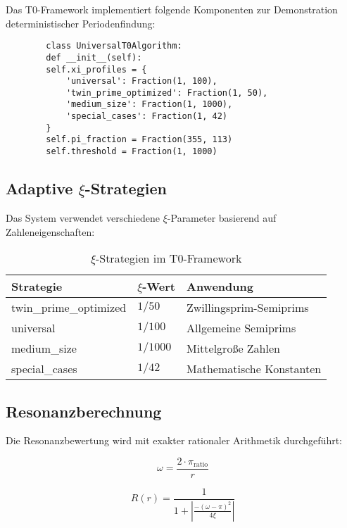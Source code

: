 \documentclass[12pt,a4paper]{article}
\begin{document}
	Das T0-Framework implementiert folgende Komponenten zur Demonstration deterministischer Periodenfindung:
	
	\begin{verbatim}
		class UniversalT0Algorithm:
		def __init__(self):
		self.xi_profiles = {
			'universal': Fraction(1, 100),
			'twin_prime_optimized': Fraction(1, 50),
			'medium_size': Fraction(1, 1000),
			'special_cases': Fraction(1, 42)
		}
		self.pi_fraction = Fraction(355, 113)
		self.threshold = Fraction(1, 1000)
	\end{verbatim}
	
	\subsection{Adaptive $\xi$-Strategien}
	
	Das System verwendet verschiedene $\xi$-Parameter basierend auf Zahleneigenschaften:
	
	\begin{table}[H]
		\centering
		\caption{$\xi$-Strategien im T0-Framework}
		\begin{tabular}{lll}
			\toprule
			\textbf{Strategie} & \textbf{$\xi$-Wert} & \textbf{Anwendung} \\
			\midrule
			twin\_prime\_optimized & $1/50$ & Zwillingsprim-Semiprims \\
			universal & $1/100$ & Allgemeine Semiprims \\
			medium\_size & $1/1000$ & Mittelgroße Zahlen \\
			special\_cases & $1/42$ & Mathematische Konstanten \\
			\bottomrule
		\end{tabular}
		\label{tab:xi_strategies}
	\end{table}
	
	\subsection{Resonanzberechnung}
	
	Die Resonanzbewertung wird mit exakter rationaler Arithmetik durchgeführt:
	
	\begin{equation}
		\omega = \frac{2 \cdot \pi_{\text{ratio}}}{r}
	\end{equation}
	
	\begin{equation}
		R(r) = \frac{1}{1 + \left|\frac{-(\omega-\pi)^2}{4\xi}\right|}
	\end{equation}
	
\end{document}
